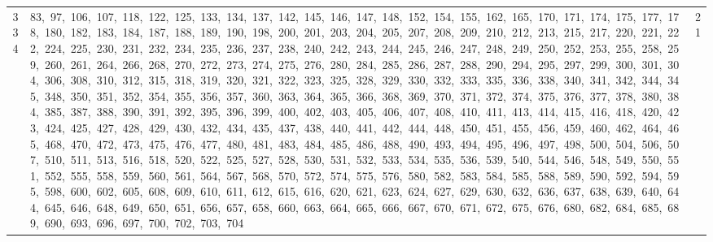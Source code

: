 \begin{longtable}{c|p{}|r}
334 & 83,\ 97,\ 106,\ 107,\ 118,\ 122,\ 125,\ 133,\ 134,\ 137,\ 142,\ 145,\ 146,\ 147,\ 148,\ 152,\ 154,\ 155,\ 162,\ 165,\ 170,\ 171,\ 174,\ 175,\ 177,\ 178,\ 180,\ 182,\ 183,\ 184,\ 187,\ 188,\ 189,\ 190,\ 198,\ 200,\ 201,\ 203,\ 204,\ 205,\ 207,\ 208,\ 209,\ 210,\ 212,\ 213,\ 215,\ 217,\ 220,\ 221,\ 222,\ 224,\ 225,\ 230,\ 231,\ 232,\ 234,\ 235,\ 236,\ 237,\ 238,\ 240,\ 242,\ 243,\ 244,\ 245,\ 246,\ 247,\ 248,\ 249,\ 250,\ 252,\ 253,\ 255,\ 258,\ 259,\ 260,\ 261,\ 264,\ 266,\ 268,\ 270,\ 272,\ 273,\ 274,\ 275,\ 276,\ 280,\ 284,\ 285,\ 286,\ 287,\ 288,\ 290,\ 294,\ 295,\ 297,\ 299,\ 300,\ 301,\ 304,\ 306,\ 308,\ 310,\ 312,\ 315,\ 318,\ 319,\ 320,\ 321,\ 322,\ 323,\ 325,\ 328,\ 329,\ 330,\ 332,\ 333,\ 335,\ 336,\ 338,\ 340,\ 341,\ 342,\ 344,\ 345,\ 348,\ 350,\ 351,\ 352,\ 354,\ 355,\ 356,\ 357,\ 360,\ 363,\ 364,\ 365,\ 366,\ 368,\ 369,\ 370,\ 371,\ 372,\ 374,\ 375,\ 376,\ 377,\ 378,\ 380,\ 384,\ 385,\ 387,\ 388,\ 390,\ 391,\ 392,\ 395,\ 396,\ 399,\ 400,\ 402,\ 403,\ 405,\ 406,\ 407,\ 408,\ 410,\ 411,\ 413,\ 414,\ 415,\ 416,\ 418,\ 420,\ 423,\ 424,\ 425,\ 427,\ 428,\ 429,\ 430,\ 432,\ 434,\ 435,\ 437,\ 438,\ 440,\ 441,\ 442,\ 444,\ 448,\ 450,\ 451,\ 455,\ 456,\ 459,\ 460,\ 462,\ 464,\ 465,\ 468,\ 470,\ 472,\ 473,\ 475,\ 476,\ 477,\ 480,\ 481,\ 483,\ 484,\ 485,\ 486,\ 488,\ 490,\ 493,\ 494,\ 495,\ 496,\ 497,\ 498,\ 500,\ 504,\ 506,\ 507,\ 510,\ 511,\ 513,\ 516,\ 518,\ 520,\ 522,\ 525,\ 527,\ 528,\ 530,\ 531,\ 532,\ 533,\ 534,\ 535,\ 536,\ 539,\ 540,\ 544,\ 546,\ 548,\ 549,\ 550,\ 551,\ 552,\ 555,\ 558,\ 559,\ 560,\ 561,\ 564,\ 567,\ 568,\ 570,\ 572,\ 574,\ 575,\ 576,\ 580,\ 582,\ 583,\ 584,\ 585,\ 588,\ 589,\ 590,\ 592,\ 594,\ 595,\ 598,\ 600,\ 602,\ 605,\ 608,\ 609,\ 610,\ 611,\ 612,\ 615,\ 616,\ 620,\ 621,\ 623,\ 624,\ 627,\ 629,\ 630,\ 632,\ 636,\ 637,\ 638,\ 639,\ 640,\ 644,\ 645,\ 646,\ 648,\ 649,\ 650,\ 651,\ 656,\ 657,\ 658,\ 660,\ 663,\ 664,\ 665,\ 666,\ 667,\ 670,\ 671,\ 672,\ 675,\ 676,\ 680,\ 682,\ 684,\ 685,\ 689,\ 690,\ 693,\ 696,\ 697,\ 700,\ 702,\ 703,\ 704 & 21 \\

\end{longtable}
